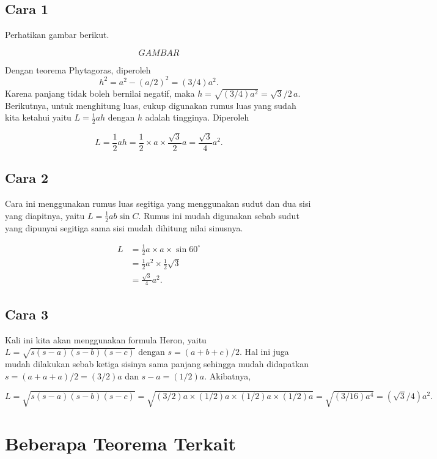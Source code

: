\documentclass[12pt]{article}
\begin{document}
\subsection*{Cara 1}

Perhatikan gambar berikut. 

$$ GAMBAR $$

Dengan teorema Phytagoras, diperoleh 
$$ h^2 = a^2 - (a/2)^2 = (3/4)a^2. $$
Karena panjang tidak boleh bernilai negatif, maka $h = \sqrt{(3/4)a^2} = \sqrt{3}/2 \, a$. Berikutnya, untuk menghitung
luas, cukup digunakan rumus luas yang sudah kita ketahui yaitu $L= \frac{1}{2} a h$ dengan $h$ adalah tingginya. Diperoleh 

$$ L = \frac{1}{2} a h = \frac{1}{2} \times a \times \frac{\sqrt{3}}{2}a = \frac{\sqrt{3}}{4} a^2. $$

\subsection*{Cara 2}

Cara ini menggunakan rumus luas segitiga yang menggunakan sudut dan dua sisi yang diapitnya, yaitu $L = \frac{1}{2} ab \sin C$. Rumus ini mudah digunakan sebab sudut yang dipunyai segitiga sama sisi mudah dihitung nilai sinusnya. 

$$ 
\begin{aligned}
L &= \frac{1}{2} a \times a \times \sin 60^\circ \\&= \frac{1}{2} a^2 \times \frac{1}{2} \sqrt{3} \\&= \frac{\sqrt{3}}{4} a^2.
\end{aligned}
$$

\subsection*{Cara 3}
Kali ini kita akan menggunakan formula Heron, yaitu $L = \sqrt{s(s-a)(s-b)(s-c)}$ dengan $s=(a+b+c)/2$. Hal ini juga mudah dilakukan sebab ketiga sisinya sama panjang sehingga mudah didapatkan $s=(a+a+a)/2 = (3/2)a$ dan $s-a = (1/2)a$. Akibatnya,

$$ L = \sqrt{s(s-a)(s-b)(s-c)} = \sqrt{(3/2)a \times (1/2)a\times (1/2)a\times (1/2)a} = \sqrt{(3/16) a^4} = (\sqrt{3}/4) a^2.$$



\section*{Beberapa Teorema Terkait}
\end{document}
